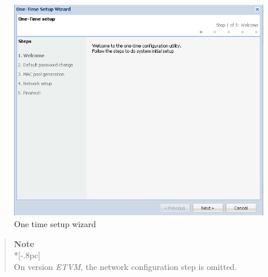 \begin{figure}[H]
        \begin{center}
        \includegraphics[scale=0.7]{screenshots/first_time_wizard.png}
        \caption{One time setup wizard}
        \label{fig:first_time_wizard}
        \end{center}
\end{figure}

\begin{quote}
	{\large \bf Note} \\*[-.8pc]
	\underline{\hspace{6in}} \\
	On version \emph{ETVM}, the network configuration step is omitted.
\end{quote}

